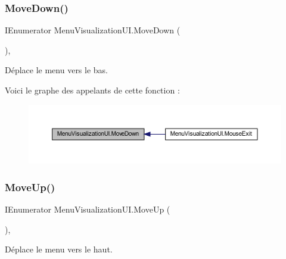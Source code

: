 \subsubsection{\texorpdfstring{Move\+Down()}{MoveDown()}}
{\footnotesize\ttfamily I\+Enumerator Menu\+Visualization\+U\+I.\+Move\+Down (\begin{DoxyParamCaption}{ }\end{DoxyParamCaption})\hspace{0.3cm}{\ttfamily [inline]}, {\ttfamily [private]}}



Déplace le menu vers le bas. 

Voici le graphe des appelants de cette fonction \+:
\nopagebreak
\begin{figure}[H]
\begin{center}
\leavevmode
\includegraphics[width=350pt]{class_menu_visualization_u_i_a65d11fcd4e858cf3bb0c4fdc95128030_icgraph}
\end{center}
\end{figure}
\mbox{\label{class_menu_visualization_u_i_a78a78af22e7a9248292601026c8429cb}} 
\subsubsection{\texorpdfstring{Move\+Up()}{MoveUp()}}
{\footnotesize\ttfamily I\+Enumerator Menu\+Visualization\+U\+I.\+Move\+Up (\begin{DoxyParamCaption}{ }\end{DoxyParamCaption})\hspace{0.3cm}{\ttfamily [inline]}, {\ttfamily [private]}}



Déplace le menu vers le haut. 

\mbox{\label{class_menu_visualization_u_i_aeb3cdd54092efba28c3a0c693dd64040}} 
